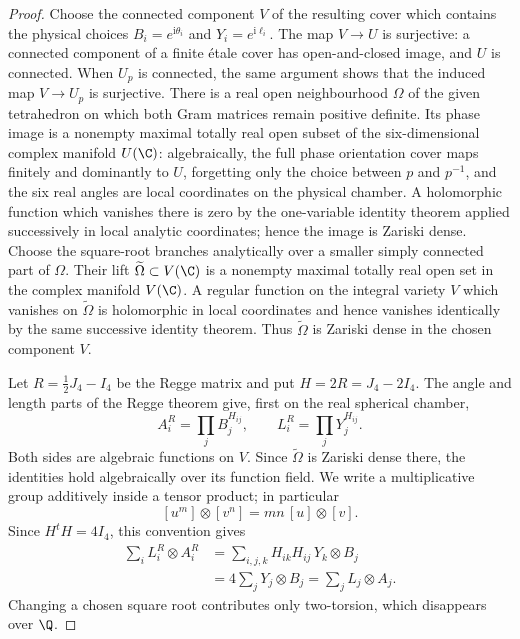 \begin{proof}
Choose the connected component \(V\) of the resulting cover which contains the
physical choices \(B_i=e^{\mathrm i\theta_i}\) and
\(Y_i=e^{\mathrm i\ell_i}\).  The map \(V\to U\) is surjective: a connected
component of a finite \'{e}tale cover has open-and-closed image, and \(U\)
is connected.  When \(U_p\) is connected, the same argument shows that the
induced map \(V\to U_p\) is surjective.  There is a real open neighbourhood
\(\Omega\) of the given
tetrahedron on which both Gram matrices remain positive definite.  Its
phase image is a nonempty maximal totally real open subset of the
six-dimensional complex manifold \(U(\C)\): algebraically, the full phase
orientation cover maps finitely and dominantly to \(U\), forgetting only
the choice between \(p\) and \(p^{-1}\), and the six real angles are local
coordinates on the physical chamber.  A holomorphic function which
vanishes there is zero by the one-variable identity theorem applied
successively in local analytic coordinates; hence the image is Zariski
dense.  Choose the square-root branches analytically over a smaller simply
connected part of \(\Omega\).  Their lift
\(\widetilde\Omega\subset V(\C)\) is a nonempty maximal totally real open
set in the complex manifold \(V(\C)\).  A regular function on the integral
variety \(V\) which vanishes on \(\widetilde\Omega\) is holomorphic in local
coordinates and hence vanishes identically by the same successive identity
theorem.  Thus \(\widetilde\Omega\) is Zariski dense in the chosen
component \(V\).

Let \(R=\tfrac12J_4-I_4\) be the Regge matrix and put
\(H=2R=J_4-2I_4\).  The angle and length parts of the Regge theorem give,
first on the real spherical chamber,
\begin{equation}
 A_i^R=\prod_jB_j^{H_{ij}},
 \qquad
 L_i^R=\prod_jY_j^{H_{ij}}.
 \label{cp:eq-monomial-angle-length}
\end{equation}
Both sides are algebraic functions on \(V\).  Since \(\widetilde\Omega\) is Zariski
dense there, the identities hold algebraically over its function field.
We write a multiplicative group additively inside a tensor product; in
particular
\[
 [u^m]\otimes[v^n]=mn\,[u]\otimes[v].
\]
Since \(H^tH=4I_4\), this convention gives
\[
 \begin{aligned}
  \sum_i L_i^R\otimes A_i^R
   &=\sum_{i,j,k}H_{ik}H_{ij}\,Y_k\otimes B_j\\
   &=4\sum_jY_j\otimes B_j
    =\sum_jL_j\otimes A_j.
 \end{aligned}
\]
Changing a chosen square root contributes only two-torsion, which
disappears over \(\Q\).


\end{proof}
